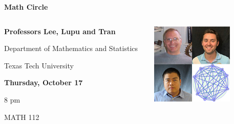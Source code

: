 \documentclass[compress,aspectratio=169]{beamer}
\date{}
\begin{document}
\begin{frame}[fragile]
\centering
\textbf{\huge
Math Circle}
\vspace{1em}
\begin{columns}
\begin{column}{0.55\textwidth}
\centering
\textbf{
}

\textbf{
\large
Professors Lee, Lupu and Tran
}

Department of Mathematics and Statistics

Texas Tech University

\vspace{2em}
\textbf{
Thursday, October 17
}

8 pm

MATH 112

\end{column}
\begin{column}{0.45\textwidth}
\centering
\includegraphics[width=0.7\textwidth]{math_circle.jpg}

\end{column}
\end{columns}


\end{frame}
\end{document}
